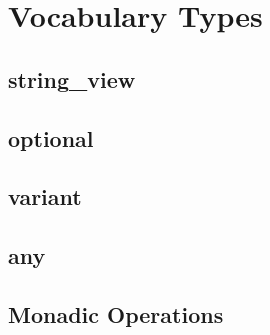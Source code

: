 \section{Vocabulary Types}\label{sec:vocab}

\subsection{string\_view}

\subsection{optional}

\subsection{variant}

\subsection{any}

\subsection{Monadic Operations}
